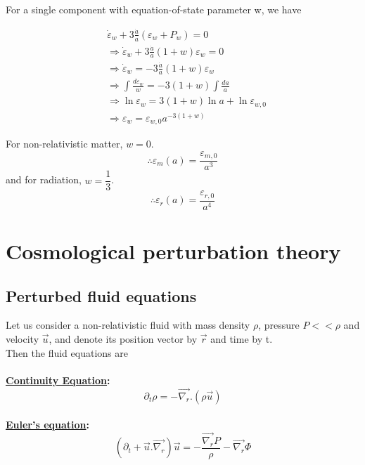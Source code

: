 \documentclass[a4,12pt,oneside]{report}
\begin{document}
   For a single component with equation-of-state parameter w, we have
   
   \begin{align}
	   &\dot{\varepsilon}_w + 3\frac{\dot{a}}{a}(\varepsilon_w + P_w) = 0 \\
	   &\Rightarrow \dot{\varepsilon}_w + 3\frac{\dot{a}}{a}(1+w)\varepsilon_w = 0 \\
	   &\Rightarrow \dot{\varepsilon}_w = -3\frac{\dot{a}}{a}(1+w)\varepsilon_w \\
	   &\Rightarrow \int \frac{d\varepsilon_w}{w} = -3(1+w)\int \frac{da}{a} \\
	   &\Rightarrow \ln \varepsilon_w = 3(1+w) \ln a + \ln \varepsilon_{w,0} \\
	   &\Rightarrow \varepsilon_w = \varepsilon_{w,0} a^{-3(1+w)} 
   \end{align}
   
   For non-relativistic matter, $ w=0 $.
   \begin{equation}\label{key}
	   \therefore \boxed{\varepsilon_m(a) = \frac{\varepsilon_{m,0}}{a^3}}
   \end{equation}
   and for radiation, $ w=\dfrac{1}{3} $.
   \begin{equation}\label{key}
	   \therefore \boxed{\varepsilon_r(a) = \frac{\varepsilon_{r,0}}{a^4}}
   \end{equation}
   
   \chapter{Cosmological perturbation theory}
 
   \section{Perturbed fluid equations}
   Let us consider a non-relativistic fluid with mass density $ \rho $, pressure $ P <<\rho $ and velocity $ \vec{u} $, and denote its position vector by $ \vec{r} $ and time by t.
   \\
   Then the fluid equations are
   \\ \\
   {\bf\underline{Continuity Equation}:}
   \begin{equation}
   \partial_t \rho = -\overrightarrow{\nabla_r}.(\rho \vec{u})
   \end{equation}
   \\
   {\bf\underline{Euler's equation}:}
   \begin{equation}
   (\partial_t + \vec{u}.\overrightarrow{\nabla_r})\vec{u} = - \frac{\overrightarrow{\nabla_r}P}{\rho} - \overrightarrow{\nabla_r}\Phi
   \end{equation}
   
\end{document}
